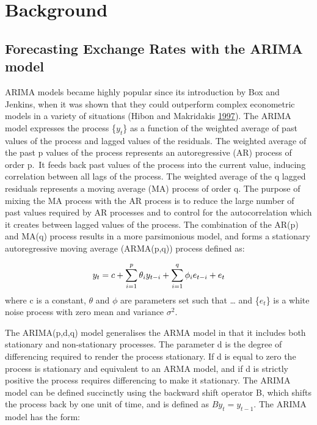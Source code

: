 \documentclass[12pt,preprint, authoryear]{elsarticle}
\numberwithin{equation}{section}
\numberwithin{figure}{section}
\numberwithin{table}{section}
\begin{document}
\section{\texorpdfstring{Background
\label{Background}}{Background }}\label{background}

\subsection{Forecasting Exchange Rates with the ARIMA
model}\label{forecasting-exchange-rates-with-the-arima-model}

ARIMA models became highly popular since its introduction by Box and
Jenkins, when it was shown that they could outperform complex
econometric models in a variety of situations (Hibon and Makridakis
\protect\hyperlink{ref-spyros1997}{1997}). The ARIMA model expresses the
process \{\(y_t\)\} as a function of the weighted average of past values
of the process and lagged values of the residuals. The weighted average
of the past p values of the process represents an autoregressive (AR)
process of order p.~It feeds back past values of the process into the
current value, inducing correlation between all lags of the process. The
weighted average of the q lagged residuals represents a moving average
(MA) process of order q. The purpose of mixing the MA process with the
AR process is to reduce the large number of past values required by AR
processes and to control for the autocorrelation which it creates
between lagged values of the process. The combination of the AR(p) and
MA(q) process results in a more parsimonious model, and forms a
stationary autoregressive moving average (ARMA(p,q)) process defined as:

\[ 
    y_t = c + \sum_{i = 1}^{p} \theta_{i} y_{t-i} + \sum_{i = 1}^{q} \phi_{i} e_{t-i}+ e_t \label{eq1} \\ \notag
\] where c is a constant, \(\theta\) and \(\phi\) are parameters set
such that \ldots{} and \{\(e_t\)\} is a white noise process with zero
mean and variance \(\sigma^2\).

The ARIMA(p,d,q) model generalises the ARMA model in that it includes
both stationary and non-stationary processes. The parameter d is the
degree of differencing required to render the process stationary. If d
is equal to zero the process is stationary and equivalent to an ARMA
model, and if d is strictly positive the process requires differencing
to make it stationary. The ARIMA model can be defined succinctly using
the backward shift operator B, which shifts the process back by one unit
of time, and is defined as \(By_t = y_{t-1}\). The ARIMA model has the
form:
\end{document}
